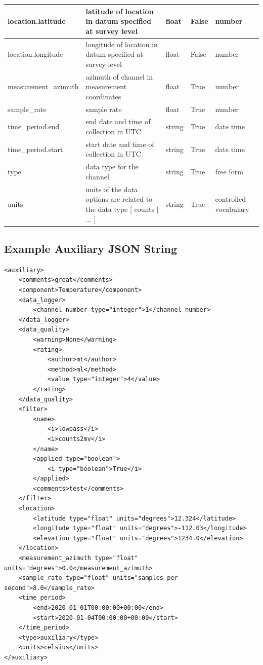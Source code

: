 \documentclass{article}
\begin{document}
\begin{table}[htb!]
\begin{tabular}{|l|p{2.75in}|l|l|p{.95in}|}
        location.latitude & latitude of location in datum specified at survey level & float & False & number  \\ \hline
        location.longitude & longitude of location in datum specified at survey level & float & False & number  \\ \hline
        measurement\_azimuth & azimuth of channel in measurement coordinates & float & True & number  \\ \hline
        sample\_rate & sample rate & float & True & number  \\ \hline
        time\_period.end & end date and time of collection in UTC & string & True & date time  \\ \hline
        time\_period.start & start date and time of collection in UTC & string & True & date time  \\ \hline
        type & data type for the channel & string & True & free form  \\ \hline
        units & units of the data options are related to the data type [ counts $|$ ... ] & string & True & controlled vocabulary \\ \hline
    \end{tabular}
    \label{tab:aux}
\end{table}

\newpage
\subsection{Example Auxiliary JSON String} 

\begin{verbatim}
<auxiliary>
    <comments>great</comments>
    <component>Temperature</component>
    <data_logger>
        <channel_number type="integer">1</channel_number>
    </data_logger>
    <data_quality>
        <warning>None</warning>
        <rating>
            <author>mt</author>
            <method>ml</method>
            <value type="integer">4</value>
        </rating>
    </data_quality>
    <filter>
        <name>
            <i>lowpass</i>
            <i>counts2mv</i>
        </name>
        <applied type="boolean">
            <i type="boolean">True</i>
        </applied>
        <comments>test</comments>
    </filter>
    <location>
        <latitude type="float" units="degrees">12.324</latitude>
        <longitude type="float" units="degrees">-112.03</longitude>
        <elevation type="float" units="degrees">1234.0</elevation>
    </location>
    <measurement_azimuth type="float" units="degrees">0.0</measurement_azimuth>
    <sample_rate type="float" units="samples per second">8.0</sample_rate>
    <time_period>
        <end>2020-01-01T00:00:00+00:00</end>
        <start>2020-01-04T00:00:00+00:00</start>
    </time_period>
    <type>auxiliary</type>
    <units>celsius</units>
</auxiliary>
\end{verbatim}
\end{document}
